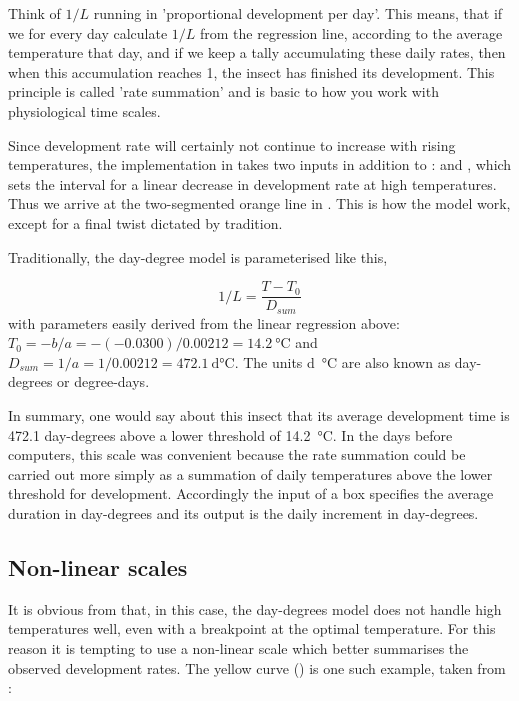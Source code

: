 Think of $1/L$ running in  'proportional development per day'. This means, that if we for every day calculate $1/L$ from the regression line, according to the average temperature that day, and if we keep a tally accumulating these daily rates, then when this accumulation reaches 1, the insect has finished its development. This principle is called 'rate summation' and is basic to how you work with physiological time scales.

Since development rate will certainly not continue to increase with rising temperatures, the implementation in  takes two inputs in addition to :  and , which sets the interval for a linear decrease in development rate at high temperatures. Thus we arrive at the two-segmented orange line in . This is how the  model work, except for a final twist dictated by tradition.

Traditionally, the day-degree model is parameterised like this,

\begin{equation}
  1/L = \frac{T-T_0}{D_{sum}} \label{eq:day-degrees}
\end{equation}
with parameters easily derived from the linear regression above: $T_0=-b/a=-(-0.0300)/0.00212=\SI{14.2}{\celsius}$ and $D_{sum}=1/a=1/0.00212=\SI{472.1}{\day\celsius}$. The units \si{\day\celsius} are also known as day-degrees or degree-days. 

In summary, one would say about this insect that its average development time is 472.1 day-degrees above a lower threshold of \SI{14.2}{\celsius}. In the days before computers, this scale was convenient because the rate summation could be carried out more simply as a summation of daily temperatures above the lower threshold for development. Accordingly the  input of a  box specifies the average duration in day-degrees and its output  is the daily increment in day-degrees.

\subsection{Non-linear scales}
It is obvious from  that, in this case, the day-degrees model does not handle high temperatures well, even with a breakpoint at the optimal temperature. For this reason it is tempting to use a non-linear scale which better summarises the observed development rates. The yellow curve () is one such example, taken from \citet{Briere99}:

